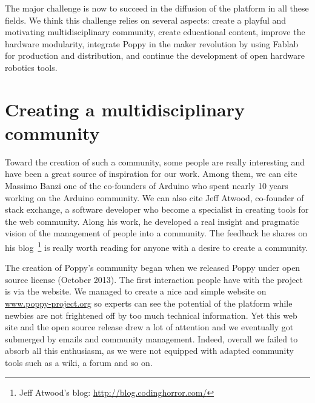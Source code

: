 
The major challenge is now to succeed in the diffusion of the platform in all these fields.
We think this challenge relies on several aspects: create a playful and motivating multidisciplinary community, create educational content, improve the hardware modularity, integrate Poppy in the maker revolution by using Fablab for production and distribution, and continue the development of open hardware robotics tools.





\section{Creating a multidisciplinary community} %
\label{sec:creating_a_multi}

Toward the creation of such a community, some people are really interesting and have been a great source of inspiration for our work. Among them, we can cite Massimo Banzi one of the co-founders of Arduino who spent nearly 10 years working on the Arduino community. We can also cite Jeff Atwood, co-founder of stack exchange, a software developer who become a specialist in creating tools for the web community. Along his work, he developed a real insight and pragmatic vision of the management of people into a community. The feedback he shares on his blog~\footnote{Jeff Atwood's blog: \url{http://blog.codinghorror.com/}} is really worth reading for anyone with a desire to create a community.

The creation of Poppy's community began when we released Poppy under open source license (October 2013).
The first interaction people have with the project is via the website. We managed to create a nice and simple website on \url{www.poppy-project.org} so experts can see the potential of the platform while newbies are not frightened off by too much technical information.
Yet this web site and the open source release drew a lot of attention and we eventually got submerged by emails and community management. Indeed, overall  we failed to absorb all this enthusiasm, as we were not equipped with adapted community tools such as a wiki, a forum and so on.

